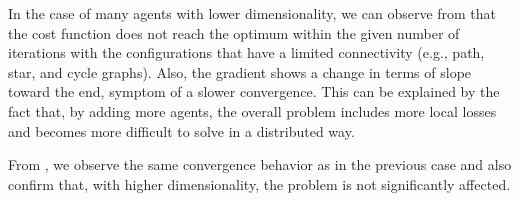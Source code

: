 \documentclass[a4paper,11pt,oneside]{book}
\begin{document}
In the case of many agents with lower dimensionality, we can observe from  that the cost function does not reach the optimum within the given number of iterations with the configurations that have a limited connectivity (e.g., path, star, and cycle graphs). Also, the gradient shows a change in terms of slope toward the end, symptom of a slower convergence. This can be explained by the fact that, by adding more agents, the overall problem includes more local losses and becomes more difficult to solve in a distributed way.

From , we observe the same convergence behavior as in the previous case and also confirm that, with higher dimensionality, the problem is not significantly affected.



\end{document}
